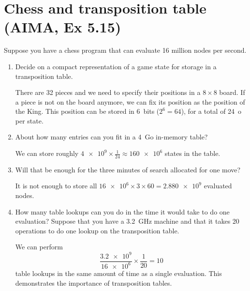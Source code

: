\documentclass[11pt, a4paper]{article}
\begin{document}
\section{Chess and transposition table (AIMA, Ex 5.15)}

Suppose you have a chess program that can evaluate 16 million nodes per second.

\begin{enumerate}
    \item Decide on a compact representation of a game state for storage in a transposition table.

    \begin{solution}
        There are 32 pieces and we need to specify their positions in a $8 \times 8$ board. If a piece is not on the board anymore, we can fix its position as the position of the King. This position can be stored in \qty{6}{bits} ($2^6 = 64$), for a total of \qty{24}{o} per state.
    \end{solution}

    \item About how many entries can you fit in a \qty{4}{\giga o} in-memory table?

    \begin{solution}
        We can store roughly $\num{4e9} \times \frac{1}{24} \approx \num{160e6}$ states in the table.
    \end{solution}

    \item Will that be enough for the three minutes of search allocated for one move?

    \begin{solution}
        It is not enough to store all $\num{16e6} \times 3 \times 60 = \num{2.880e9}$ evaluated nodes.
    \end{solution}

    \item How many table lookups can you do in the time it would take to do one evaluation? Suppose that you have a \qty{3.2}{\giga\hertz} machine and that it takes 20 operations to do one lookup on the transposition table.

    \begin{solution}
        We can perform
        \begin{equation*}
            \frac{\num{3.2e9}}{\num{16e6}} \times \frac{1}{20} = 10
        \end{equation*}
        table lookups in the same amount of time as a single evaluation. This demonstrates the importance of transposition tables.
    \end{solution}
\end{enumerate}
\end{document}
